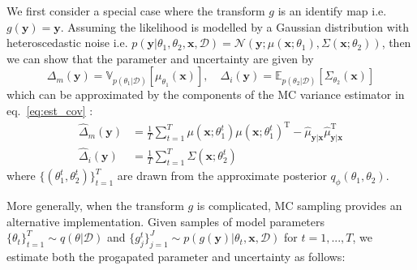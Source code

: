 We first consider a special case where the transform $g$ is an identify map i.e. $g(\mathbf{y})=\mathbf{y}$. Assuming the likelihood is modelled by a Gaussian distribution with heteroscedastic noise i.e. $p(\mathbf{y}|\theta_1, \theta_2, \mathbf{x},\mathcal{D}) = \mathcal{N}(\mathbf{y}; \mu(\mathbf{x};\theta_1),\Sigma(\mathbf{x};\theta_2))$, then we can show that the parameter and  uncertainty are given by
\begin{equation}
\Delta_{m}(\mathbf{y}) = \mathbb{V}_{p(\theta_{1}|\mathcal{D})}[\mu_{\theta_1}(\mathbf{x})], \quad \Delta_{i}(\mathbf{y})  =  \mathbb{E}_{p(\theta_{2}|\mathcal{D})}[\Sigma_{\theta_2}(\mathbf{x})]
\end{equation}
which can be approximated by the components of the MC variance estimator in eq.~\eqref{eq:est_cov} :
\begin{align}\label{eq:sampler_mean}
\widehat{\Delta}_{m}(\mathbf{y})  &=\frac{1}{T} \sum_{t=1}^T\mu(\mathbf{x};\theta_1^t)\mu(\mathbf{x};\theta_1^t)^{\text{T}} -\hat{\mu}_{\mathbf{y}|\mathbf{x}} \hat{\mu}_{\mathbf{y}|\mathbf{x}}^{\text{T}}\\ 
\widehat{\Delta}_{i}(\mathbf{y})  &= \frac{1}{T} \sum_{t=1}^T\Sigma(\mathbf{x};\theta_{2}^{t}) \label{eq:sampler_var}
\end{align}
where $\{(\theta^t_1,\theta^t_2)\}_{t=1}^T$ are drawn from the approximate posterior $q_{\phi}(\theta_1, \theta_{2})$. %


More generally, when the transform $g$ is complicated, MC sampling provides an alternative implementation. Given samples of model parameters $\{\theta_{t}\}_{t=1}^{T} \sim q(\theta|\mathcal{D})$ and $\{g^{t}_{j}\}_{j=1}^J \sim p(g(\mathbf{y})|\theta_{t},\mathbf{x},\mathcal{D})$ for $t=1, ...,T$,  we estimate both the progapated parameter and  uncertainty as follows:


